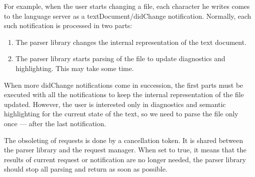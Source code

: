For example, when the user starts changing a file, each character he writes comes to the language server as a textDocument/didChange notification. Normally, each such notification is processed in two parts:
\begin{enumerate}
	\item The parser library changes the internal representation of the text document.
	\item The parser library starts parsing of the file to update diagnostics and highlighting. This may take some time.
\end{enumerate}
When more didChange notifications come in succession, the first parts must be executed with all the notifications to keep the internal representation of the file updated. However, the user is interested only in diagnostics and semantic highlighting for the current state of the text, so we need to parse the file only once --- after the last notification.

The obsoleting of requests is done by a cancellation token. It is shared between the parser library and the request manager. When set to true, it means that the results of current request or notification are no longer needed, the parser library should stop all parsing and return as soon as possible.


